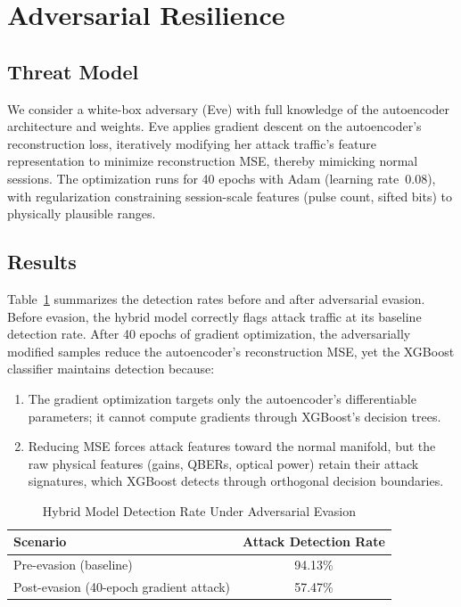 \documentclass[conference]{IEEEtran}
\begin{document}
\section{Adversarial Resilience}
\label{sec:adversarial}

\subsection{Threat Model}

We consider a white-box adversary (Eve) with full knowledge of the autoencoder architecture and weights. Eve applies gradient descent on the autoencoder's reconstruction loss, iteratively modifying her attack traffic's feature representation to minimize reconstruction MSE, thereby mimicking normal sessions. The optimization runs for 40 epochs with Adam (learning rate~0.08), with regularization constraining session-scale features (pulse count, sifted bits) to physically plausible ranges.

\subsection{Results}

Table~\ref{tab:adversarial} summarizes the detection rates before and after adversarial evasion. Before evasion, the hybrid model correctly flags attack traffic at its baseline detection rate. After 40 epochs of gradient optimization, the adversarially modified samples reduce the autoencoder's reconstruction MSE, yet the XGBoost classifier maintains detection because:

\begin{enumerate}
    \item The gradient optimization targets only the autoencoder's differentiable parameters; it cannot compute gradients through XGBoost's decision trees.
    \item Reducing MSE forces attack features toward the normal manifold, but the raw physical features (gains, QBERs, optical power) retain their attack signatures, which XGBoost detects through orthogonal decision boundaries.
\end{enumerate}

\begin{table}[htbp]
\centering
\caption{Hybrid Model Detection Rate Under Adversarial Evasion}
\label{tab:adversarial}
\begin{tabular}{@{}lc@{}}
\toprule
\textbf{Scenario} & \textbf{Attack Detection Rate} \\
\midrule
Pre-evasion (baseline) & 94.13\% \\
Post-evasion (40-epoch gradient attack) & 57.47\% \\
\bottomrule
\end{tabular}
\end{table}
\end{document}
